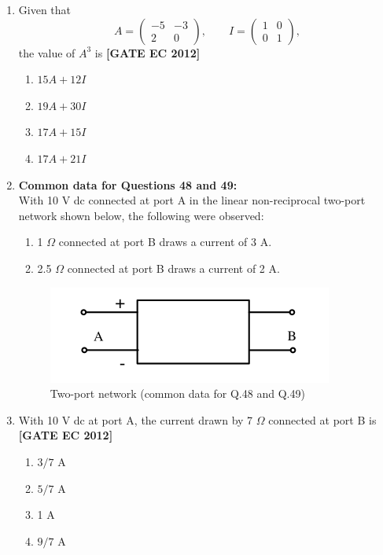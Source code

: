 \documentclass[12pt]{article}
\begin{document}
\begin{enumerate}[leftmargin=1.0em, label=\textbf{Q.\arabic*.}, itemsep=2em]
\begin{enumerate}[leftmargin=2.5em, label=\textbf{Q.\arabic*.}, itemsep=2em, start=46]
\item Given that
\[
A = \begin{pmatrix}-5 & -3\\[4pt] 2 & 0\end{pmatrix}, \qquad
I = \begin{pmatrix}1 & 0\\[4pt] 0 & 1\end{pmatrix},
\]
the value of $A^{3}$ is
\noindent \textbf{[GATE EC 2012]}
\begin{multicols}{2}
    \begin{enumerate}[label=\alph*.]
        \item $15A + 12I$
        \item $19A + 30I$
        \item $17A + 15I$
        \item $17A + 21I$
    \end{enumerate}
\end{multicols}

\item[] \textbf{Common data for Questions 48 and 49:}\\

With 10 V dc connected at port A in the linear non-reciprocal two-port network shown below, the following were observed:
\begin{enumerate}[leftmargin=*, itemsep=0.2em]
    \item 1 $\Omega$ connected at port B draws a current of 3 A.
    \item 2.5 $\Omega$ connected at port B draws a current of 2 A.
\end{enumerate}

\begin{figure}[H]\centering
\includegraphics[width=0.5\columnwidth]{figs/q48.png}
\caption{Two-port network (common data for Q.48 and Q.49)}
\label{fig:q48}
\end{figure}

\item With 10 V dc at port A, the current drawn by 7 $\Omega$ connected at port B is
\noindent \textbf{[GATE EC 2012]}
\begin{multicols}{2}
    \begin{enumerate}[label=\alph*.]
        \item $3/7$ A
        \item $5/7$ A
        \item 1 A
        \item $9/7$ A
    \end{enumerate}
\end{multicols}


\end{enumerate}
\end{enumerate}
\end{document}
